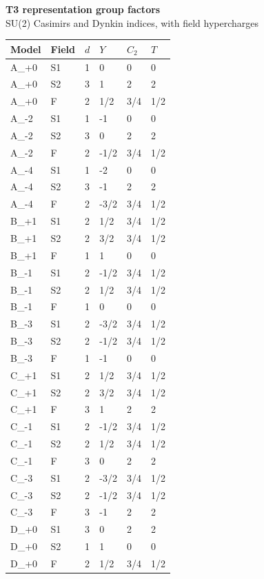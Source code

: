 \documentclass[10pt,a4paper]{article}
\begin{document}
\begin{center}
{\LARGE\bfseries T3 representation group factors}\\[5pt]
SU(2) Casimirs and Dynkin indices, with field hypercharges
\end{center}
\tableofcontents
\clearpage
\small
\begin{longtable}{llllll}
\toprule Model & Field & $d$ & $Y$ & $C_2$ & $T$ \\ \midrule
\endhead
A\_+0 & S1 & 1 & 0 & 0 & 0 \\
A\_+0 & S2 & 3 & 1 & 2 & 2 \\
A\_+0 & F & 2 & 1/2 & 3/4 & 1/2 \\
A\_-2 & S1 & 1 & -1 & 0 & 0 \\
A\_-2 & S2 & 3 & 0 & 2 & 2 \\
A\_-2 & F & 2 & -1/2 & 3/4 & 1/2 \\
A\_-4 & S1 & 1 & -2 & 0 & 0 \\
A\_-4 & S2 & 3 & -1 & 2 & 2 \\
A\_-4 & F & 2 & -3/2 & 3/4 & 1/2 \\
B\_+1 & S1 & 2 & 1/2 & 3/4 & 1/2 \\
B\_+1 & S2 & 2 & 3/2 & 3/4 & 1/2 \\
B\_+1 & F & 1 & 1 & 0 & 0 \\
B\_-1 & S1 & 2 & -1/2 & 3/4 & 1/2 \\
B\_-1 & S2 & 2 & 1/2 & 3/4 & 1/2 \\
B\_-1 & F & 1 & 0 & 0 & 0 \\
B\_-3 & S1 & 2 & -3/2 & 3/4 & 1/2 \\
B\_-3 & S2 & 2 & -1/2 & 3/4 & 1/2 \\
B\_-3 & F & 1 & -1 & 0 & 0 \\
C\_+1 & S1 & 2 & 1/2 & 3/4 & 1/2 \\
C\_+1 & S2 & 2 & 3/2 & 3/4 & 1/2 \\
C\_+1 & F & 3 & 1 & 2 & 2 \\
C\_-1 & S1 & 2 & -1/2 & 3/4 & 1/2 \\
C\_-1 & S2 & 2 & 1/2 & 3/4 & 1/2 \\
C\_-1 & F & 3 & 0 & 2 & 2 \\
C\_-3 & S1 & 2 & -3/2 & 3/4 & 1/2 \\
C\_-3 & S2 & 2 & -1/2 & 3/4 & 1/2 \\
C\_-3 & F & 3 & -1 & 2 & 2 \\
D\_+0 & S1 & 3 & 0 & 2 & 2 \\
D\_+0 & S2 & 1 & 1 & 0 & 0 \\
D\_+0 & F & 2 & 1/2 & 3/4 & 1/2 \\

\end{longtable}
\end{document}
